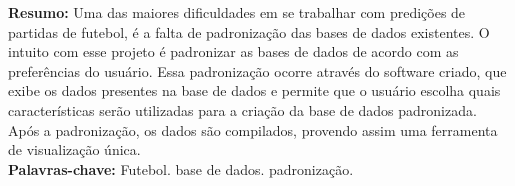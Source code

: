 \begin{singlespace}
\textbf{Resumo: }
Uma das maiores dificuldades em se trabalhar com predições de partidas de futebol, é a falta de padronização das bases de dados existentes. O intuito com esse projeto é padronizar as bases de dados de acordo com as preferências do usuário. Essa padronização ocorre através do software criado, que exibe os dados presentes na base de dados e permite que o usuário escolha quais características serão utilizadas para a criação da base de dados padronizada. Após a padronização, os dados são compilados, provendo assim uma ferramenta de visualização única.\\
\textbf{Palavras-chave: }
Futebol. base de dados. padronização.
\end{singlespace}
